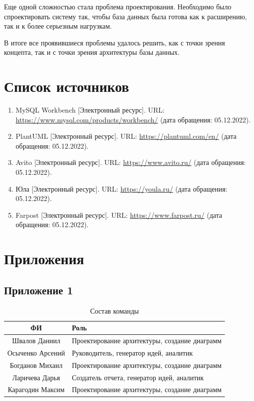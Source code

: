 \documentclass[a4paper,14pt]{extarticle}
\begin{document}
Еще одной сложностью стала проблема проектирования. Необходимо было спроектировать систему так, чтобы база данных была готова как к расширению, так и к более серьезным нагрузкам.

В итоге все проявившиеся проблемы удалось решить, как с точки зрения концепта, так и с точки зрения архитектуры базы данных.

\section{Список источников}

\begin{enumerate}
    \item MySQL Workbench [Электронный ресурс]. URL: \url{https://www.mysql.com/products/workbench/} (дата обращения: 05.12.2022).
    \item PlantUML [Электронный ресурс]. URL: \url{https://plantuml.com/en/} (дата обращения: 05.12.2022).
    \item Avito [Электронный ресурс]. URL: \url{https://www.avito.ru/} (дата обращения: 05.12.2022).
    \item Юла [Электронный ресурс]. URL: \url{https://youla.ru/} (дата обращения: 05.12.2022).
    \item Farpost [Электронный ресурс]. URL: \url{https://www.farpost.ru/} (дата обращения: 05.12.2022).
\end{enumerate}

\newpage

\section{Приложения}

\subsection*{\hfill Приложение 1}

\begin{center}
    \begin{longtable}{|c|>{\centering\arraybackslash}m{11.5cm}|}
        \caption{Состав команды}
        \label{tab:command}
        \\
        \hline
        \textbf{ФИ}      & \textbf{Роль}                                 \\
        \hline
        Швалов Даниил    & Проектирование архитектуры, создание диаграмм \\
        \hline
        Осыченко Арсений & Руководитель, генератор идей, аналитик        \\
        \hline
        Богданов Михаил  & Проектирование архитектуры, создание диаграмм \\
        \hline
        Ларичева Дарья   & Создатель отчета, генератор идей, аналитик    \\
        \hline
        Карагодин Максим & Проектирование архитектуры, создание диаграмм \\
        \hline
    \end{longtable}
\end{center}
\end{document}
